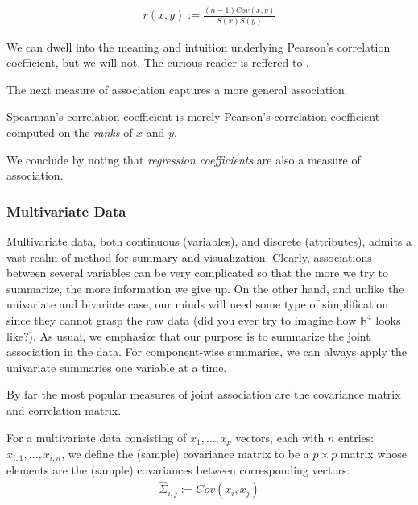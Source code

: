 \documentclass[12pt,a4paper]{report}
\begin{document}
\begin{definition}
\begin{align}
	r(x,y):= \frac{(n-1) Cov(x,y)}{S(x) S(y)}
\end{align}
\end{definition}
We can dwell into the meaning and intuition underlying Pearson's correlation coefficient, but we will not. 
The curious reader is reffered to \cite{rodgers_thirteen_1988}.

The next measure of association captures a more general association.
\begin{definition}
Spearman's correlation coefficient is merely Pearson's correlation coefficient computed on the \emph{ranks} of $x$ and $y$. 
\end{definition}

We conclude by noting that \emph{regression coefficients} are also a measure of association. 





\subsubsection{Multivariate Data}
Multivariate data, both continuous (variables), and discrete (attributes), admits a vast realm of method for summary and visualization.
Clearly, associations between several variables can be very complicated so that the more we try to summarize, the more information we give up. On the other hand, and unlike the univariate and bivariate case, our minds will need some type of simplification since they cannot grasp the raw data (did you ever try to imagine how $\mathbb{R}^4$ looks like?).
As usual, we emphasize that our purpose is to summarize the joint association in the data. 
For component-wise summaries, we can always apply the univariate summaries one variable at a time. 

By far the most popular measures of joint association are the covariance matrix and correlation matrix.

\begin{definition}
For a multivariate data consisting of $x_1,\dots,x_p$ vectors, each with $n$ entries: $x_{i,1},\dots,x_{i,n}$, we define the (sample) covariance matrix to be a $p\times p$ matrix whose elements are the (sample) covariances between corresponding vectors:
\begin{align}
	\hat{\Sigma}_{i,j}:= Cov(x_i, x_j)
\end{align}
\end{definition}
\end{document}
